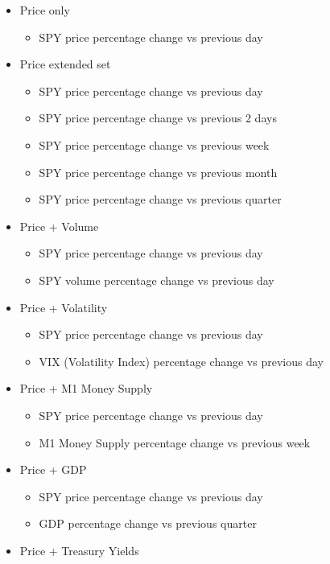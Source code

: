 \begin{itemize}
    \item Price only
    \begin{itemize}
        \item SPY price percentage change vs previous day
    \end{itemize}
    \item Price extended set
    \begin{itemize}
        \item SPY price percentage change vs previous day
        \item SPY price percentage change vs previous 2 days
        \item SPY price percentage change vs previous week
        \item SPY price percentage change vs previous month
        \item SPY price percentage change vs previous quarter
    \end{itemize}
    \item Price + Volume
    \begin{itemize}
        \item SPY price percentage change vs previous day
        \item SPY volume percentage change vs previous day
    \end{itemize}
    \item Price + Volatility
    \begin{itemize}
        \item SPY price percentage change vs previous day
        \item VIX (Volatility Index) percentage change vs previous day
    \end{itemize}
    \item Price + M1 Money Supply
    \begin{itemize}
        \item SPY price percentage change vs previous day
        \item M1 Money Supply percentage change vs previous week
    \end{itemize}
    \item Price + GDP
    \begin{itemize}
        \item SPY price percentage change vs previous day
        \item GDP percentage change vs previous quarter
    \end{itemize}
    \item Price + Treasury Yields

\end{itemize}
